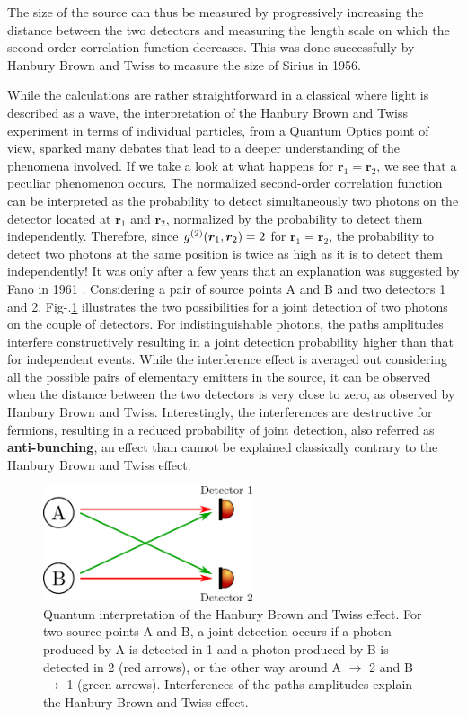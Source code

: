 \noindent The size of the source can thus be measured by progressively increasing the distance between the two detectors and measuring the length scale on which the second order correlation function decreases. This was done successfully by Hanbury Brown and Twiss \cite{brown1956test} to measure the size of Sirius in 1956.

While the calculations are rather straightforward in a classical where light is described as a wave, the interpretation of the Hanbury Brown and Twiss experiment in terms of individual particles, \ie from a Quantum Optics point of view, sparked many debates that lead to a deeper understanding of the phenomena involved. If we take a look at what happens for $\bm{r}_1=\bm{r}_2$, we see that a peculiar phenomenon occurs. The normalized second-order correlation function can be interpreted as the probability to detect simultaneously two photons on the detector located at $\bm{r}_1$ and $\bm{r}_2$, normalized by the probability to detect them independently. Therefore, since $g^{(2)} (\bm{r}_1,\bm{r}_2)=2$ for $\bm{r}_1=\bm{r}_2$, the probability to detect two photons at the same position is twice as high as it is to detect them independently! It was only after a few years that an explanation was suggested by Fano in 1961 \cite{fano1961quantum}. Considering a pair of source points A and B and two detectors 1 and 2, Fig-.\ref{fig:HBT_scheme} illustrates the two possibilities for a joint detection of two photons on the couple of detectors. For indistinguishable photons, the paths amplitudes interfere constructively resulting in a joint detection probability higher than that for independent events. While the interference effect is averaged out considering all the possible pairs of elementary emitters in the source, it can be observed when the distance between the two detectors is very close to zero, as observed by Hanbury Brown and Twiss. Interestingly, the interferences are destructive for fermions, resulting in a reduced probability of joint detection, also referred as \textbf{anti-bunching}, an effect than cannot be explained classically contrary to the Hanbury Brown and Twiss effect. 

\begin{figure}
    \centering
    \includegraphics[width=0.55\textwidth]{Fig/Chapter1/HBT_scheme.png}
    \caption[Quantum interpretation of the Hanbury Brown and Twiss effect]{Quantum interpretation of the Hanbury Brown and Twiss effect. For two source points A and B, a joint detection occurs if a photon produced by A is detected in 1 and a photon produced by B is detected in 2 (red arrows), or the other way around A $\rightarrow$ 2 and B $\rightarrow$ 1 (green arrows). Interferences of the paths amplitudes explain the Hanbury Brown and Twiss effect.}
    \label{fig:HBT_scheme}
\end{figure}

